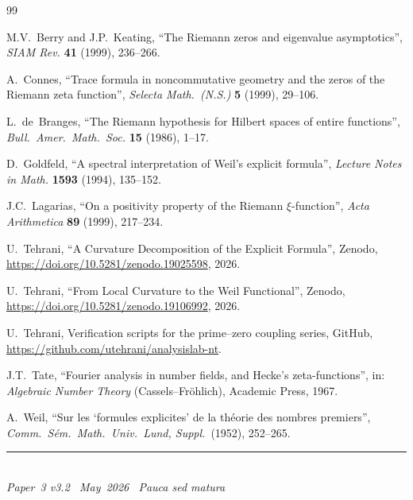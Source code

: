 \documentclass[11pt]{article}
\begin{document}
\newpage
\begin{thebibliography}{99}

M.V.~Berry and J.P.~Keating,
``The Riemann zeros and eigenvalue asymptotics'',
\emph{SIAM Rev.} \textbf{41} (1999), 236--266.

A.~Connes,
``Trace formula in noncommutative geometry and the zeros of the Riemann
zeta function'',
\emph{Selecta Math.\ (N.S.)} \textbf{5} (1999), 29--106.

L.~de~Branges,
``The Riemann hypothesis for Hilbert spaces of entire functions'',
\emph{Bull.\ Amer.\ Math.\ Soc.} \textbf{15} (1986), 1--17.

D.~Goldfeld,
``A spectral interpretation of Weil's explicit formula'',
\emph{Lecture Notes in Math.} \textbf{1593} (1994), 135--152.

J.C.~Lagarias,
``On a positivity property of the Riemann $\xi$-function'',
\emph{Acta Arithmetica} \textbf{89} (1999), 217--234.

U.~Tehrani,
``A Curvature Decomposition of the Explicit Formula'',
Zenodo, \url{https://doi.org/10.5281/zenodo.19025598}, 2026.

U.~Tehrani,
``From Local Curvature to the Weil Functional'',
Zenodo, \url{https://doi.org/10.5281/zenodo.19106992}, 2026.

U.~Tehrani,
Verification scripts for the prime--zero coupling series,
GitHub, \url{https://github.com/utehrani/analysislab-nt}.

J.T.~Tate,
``Fourier analysis in number fields, and Hecke's zeta-functions'',
in: \emph{Algebraic Number Theory} (Cassels--Fr\"ohlich),
Academic Press, 1967.

A.~Weil,
``Sur les `formules explicites' de la th\'eorie des nombres premiers'',
\emph{Comm.\ S\'em.\ Math.\ Univ.\ Lund, Suppl.}\ (1952), 252--265.

\end{thebibliography}


\enlargethispage{3\baselineskip}
\vspace*{\fill}
\begin{minipage}{\linewidth}
\rule{\linewidth}{0.4pt}\smallskip\\
\small\emph{Paper~3 v3.2 \textperiodcentered\ May~2026
\textperiodcentered\ Pauca sed matura}
\end{minipage}
\end{document}
